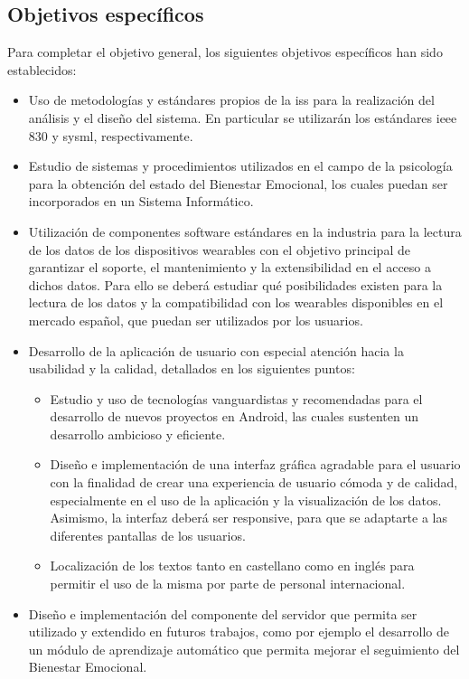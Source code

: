     \subsection{Objetivos específicos}
        Para completar el objetivo general, los siguientes objetivos específicos han sido establecidos:
        \begin{itemize}
            \item Uso de metodologías y estándares propios de la \gls{iss} para la realización del análisis y el diseño del sistema. En particular se utilizarán los estándares \gls{ieee} 830 y \gls{sysml}, respectivamente.
            \item Estudio de sistemas y procedimientos utilizados en el campo de la psicología para la obtención del estado del Bienestar Emocional, los cuales puedan ser incorporados en un Sistema Informático.
            \item Utilización de componentes software estándares en la industria para la lectura de los datos de los dispositivos \glspl{wearable} con el objetivo principal de garantizar el soporte, el mantenimiento y la extensibilidad en el acceso a dichos datos. Para ello se deberá estudiar qué posibilidades existen para la lectura de los datos y la compatibilidad con los \glspl{wearable} disponibles en el mercado español, que puedan ser utilizados por los usuarios.
            \item Desarrollo de la aplicación de usuario con especial atención hacia la usabilidad y la calidad, detallados en los siguientes puntos:
            \begin{itemize}
                \item Estudio y uso de tecnologías vanguardistas y recomendadas para el desarrollo de nuevos proyectos en Android, las cuales sustenten un desarrollo ambicioso y eficiente.
                \item Diseño e implementación de una interfaz gráfica agradable para el usuario con la finalidad de crear una experiencia de usuario cómoda y de calidad, especialmente en el uso de la aplicación y la visualización de los datos. Asimismo, la interfaz deberá ser \gls{responsive}, para que se adaptarte a las diferentes pantallas de los usuarios.
                \item Localización de los textos tanto en castellano como en inglés para permitir el uso de la misma por parte de personal internacional.
            \end{itemize}
            \item Diseño e implementación del componente del servidor que permita ser utilizado y extendido en futuros trabajos, como por ejemplo el desarrollo de un módulo de aprendizaje automático que permita mejorar el seguimiento del Bienestar Emocional.
        \end{itemize}


